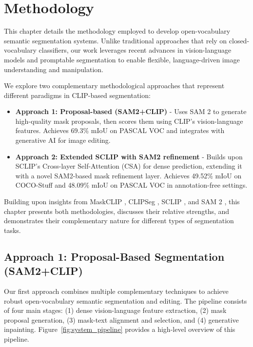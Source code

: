 \chapter{Methodology}
\label{ch:methodology}

This chapter details the methodology employed to develop open-vocabulary semantic segmentation systems. Unlike traditional approaches that rely on closed-vocabulary classifiers, our work leverages recent advances in vision-language models and promptable segmentation to enable flexible, language-driven image understanding and manipulation.

We explore two complementary methodological approaches that represent different paradigms in CLIP-based segmentation:

\begin{itemize}
    \item \textbf{Approach 1: Proposal-based (SAM2+CLIP)} - Uses SAM 2 to generate high-quality mask proposals, then scores them using CLIP's vision-language features. Achieves 69.3\% mIoU on PASCAL VOC and integrates with generative AI for image editing.

    \item \textbf{Approach 2: Extended SCLIP with SAM2 refinement} - Builds upon SCLIP's Cross-layer Self-Attention (CSA) for dense prediction, extending it with a novel SAM2-based mask refinement layer. Achieves 49.52\% mIoU on COCO-Stuff and 48.09\% mIoU on PASCAL VOC in annotation-free settings.
\end{itemize}

Building upon insights from MaskCLIP \cite{zhou2022extract}, CLIPSeg \cite{luddecke2022clipseg}, SCLIP \cite{sclip2024}, and SAM 2 \cite{ravi2024sam2}, this chapter presents both methodologies, discusses their relative strengths, and demonstrates their complementary nature for different types of segmentation tasks.

\section{Approach 1: Proposal-Based Segmentation (SAM2+CLIP)}

Our first approach combines multiple complementary techniques to achieve robust open-vocabulary semantic segmentation and editing. The pipeline consists of four main stages: (1) dense vision-language feature extraction, (2) mask proposal generation, (3) mask-text alignment and selection, and (4) generative inpainting. Figure~\ref{fig:system_pipeline} provides a high-level overview of this pipeline.

